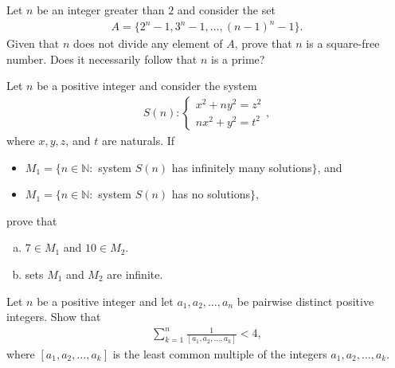 \documentclass[problems.tex]{subfile}
\begin{document}
	
	
	\begin{problem}
		Let $n$ be an integer greater than $2$ and consider the set
		\begin{align*}
			A = \{2^n-1,3^n-1,\dots,(n-1)^n-1\}.
		\end{align*}
		Given that $n$ does not divide any element of $A$, prove that $n$ is a square-free number. Does it necessarily follow that $n$ is a prime? %
	\end{problem}
	
	
	
	
	\begin{problem}
		Let $n$ be a positive integer and consider the system
		\begin{align*}
			S(n):\begin{cases}
				x^2+ny^2=z^2\\
				nx^2+y^2=t^2
			\end{cases},
		\end{align*}
		where $x,y,z$, and $t$ are naturals. If
		\begin{itemize}
			\item $M_1=\{n\in\mathbb N:$ system $S(n)$ has infinitely many solutions$\}$, and
			\item $M_1=\{n\in\mathbb N:$ system $S(n)$ has no solutions$\}$,
		\end{itemize}
		prove that
		\begin{enumerate}[(a)]
			\item $7 \in M_1$ and $10 \in M_2$.
			\item sets $M_1$ and $M_2$ are infinite.
		\end{enumerate} 
	\end{problem}
	
	
	
	\begin{problem}
		Let $n$ be a positive integer and let $a_1, a_2, \dots, a_n$ be pairwise distinct positive integers. Show that
		\begin{align*}
			\sum_{k=1}^{n} \frac{1}{[a_1, a_2, \dots, a_k]} < 4,
		\end{align*}
		where $[a_1, a_2, \dots, a_k]$ is the least common multiple of the integers $a_1, a_2, \dots, a_k$.
	\end{problem}
	
\end{document}
